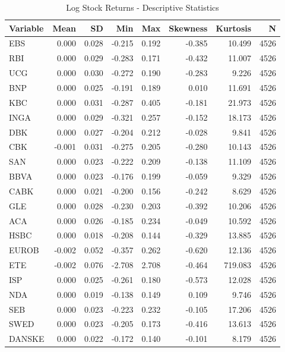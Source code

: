 \begin{table}

\caption{Log Stock Returns - Descriptive Statistics}
\centering
\begin{tabular}[t]{lrrrrrrr}
\toprule
Variable & Mean & SD & Min & Max & Skewness & Kurtosis & N\\
\midrule
EBS & 0.000 & 0.028 & -0.215 & 0.192 & -0.385 & 10.499 & 4526\\
RBI & 0.000 & 0.029 & -0.283 & 0.171 & -0.432 & 11.007 & 4526\\
UCG & 0.000 & 0.030 & -0.272 & 0.190 & -0.283 & 9.226 & 4526\\
BNP & 0.000 & 0.025 & -0.191 & 0.189 & 0.010 & 11.691 & 4526\\
KBC & 0.000 & 0.031 & -0.287 & 0.405 & -0.181 & 21.973 & 4526\\
\addlinespace
INGA & 0.000 & 0.029 & -0.321 & 0.257 & -0.152 & 18.173 & 4526\\
DBK & 0.000 & 0.027 & -0.204 & 0.212 & -0.028 & 9.841 & 4526\\
CBK & -0.001 & 0.031 & -0.275 & 0.205 & -0.280 & 10.143 & 4526\\
SAN & 0.000 & 0.023 & -0.222 & 0.209 & -0.138 & 11.109 & 4526\\
BBVA & 0.000 & 0.023 & -0.176 & 0.199 & -0.059 & 9.329 & 4526\\
\addlinespace
CABK & 0.000 & 0.021 & -0.200 & 0.156 & -0.242 & 8.629 & 4526\\
GLE & 0.000 & 0.028 & -0.230 & 0.203 & -0.392 & 10.206 & 4526\\
ACA & 0.000 & 0.026 & -0.185 & 0.234 & -0.049 & 10.592 & 4526\\
HSBC & 0.000 & 0.018 & -0.208 & 0.144 & -0.329 & 13.885 & 4526\\
EUROB & -0.002 & 0.052 & -0.357 & 0.262 & -0.620 & 12.136 & 4526\\
\addlinespace
ETE & -0.002 & 0.076 & -2.708 & 2.708 & -0.464 & 719.083 & 4526\\
ISP & 0.000 & 0.025 & -0.261 & 0.180 & -0.573 & 12.028 & 4526\\
NDA & 0.000 & 0.019 & -0.138 & 0.149 & 0.109 & 9.746 & 4526\\
SEB & 0.000 & 0.023 & -0.223 & 0.232 & -0.105 & 17.206 & 4526\\
SWED & 0.000 & 0.023 & -0.205 & 0.173 & -0.416 & 13.613 & 4526\\
\addlinespace
DANSKE & 0.000 & 0.022 & -0.172 & 0.140 & -0.101 & 8.179 & 4526\\
\bottomrule
\end{tabular}
\end{table}
